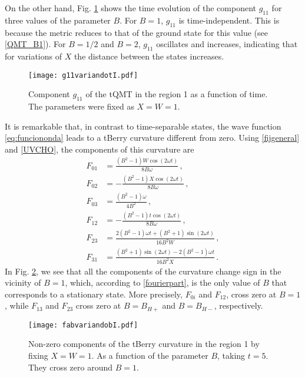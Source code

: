 \documentclass[12pt]{iopart}
\begin{document}
On the other hand, Fig. \ref{g11osc} shows the time evolution of the component $g_{11}$ for three values of the parameter $B$. For $B=1$, $g_{11}$ is time-independent. This is because the metric reduces to that of the ground state for this value (see \eqref{QMT_B1}). For $B=1/2$ and $B=2$, $g_{11}$ oscillates and increases, indicating that for variations of $X$ the distance between the states increases.  

\begin{figure}[ht!]
    \centering
    \texttt{[image: g11variandotI.pdf]}
  \captionsetup{font=small} 
    \caption{\justifying Component $g_{11}$ of the tQMT in the region 1 as a function of time. The parameters were fixed as $X=W=1$.}
    \label{g11osc}
\end{figure}

It is remarkable that, in contrast to time-separable states, the wave function \eqref{eq:funciononda} leads to a tBerry curvature different from zero. Using \eqref{fijgeneral} and \eqref{UVCHO}, the components of this curvature are
\begin{subequations}
    \begin{align}
    F_{01}&=\frac{\left(B^2-1\right) W \cos \left(2  \omega t\right)}{8 B \omega}\, ,\\
    F_{02} &= -\frac{\left(B^2-1\right) X \cos \left(2  \omega t \right)}{8 B \omega }\,,\\
    F_{03}&= \frac{\left(B^2-1\right) \omega}{4 B^2} \,,\\
     F_{12} &=-\frac{\left(B^2-1\right) t \cos \left(2  \omega t \right)}{8 B \omega }\,,\\ 
    F_{23} &=\frac{2 \left(B^2-1\right)  \omega t +\left(B^2+1\right) \sin \left(2  \omega t \right)}{16 B^2 W}\,,\\
    F_{31} &=\frac{\left(B^2+1\right) \sin \left(2  \omega t \right)-2 \left(B^2-1\right)  \omega t}{16 B^2 X}\,.
    \end{align}
\end{subequations}
In Fig. \ref{berry01}, we see that all the components of the curvature change sign in the vicinity of $B=1$, which, according to \eqref{fourierpart}, is the only value of $B$ that corresponds to a stationary state. More precisely, $F_{0i}$ and $F_{12}$, cross zero at $B=1$, while $F_{13}$ and $F_{23}$ cross zero at $B=B_{H+}$ and $B=B_{H-}$, respectively. 

\begin{figure}[H]
    \centering
    \texttt{[image: fabvariandobI.pdf]}
    \captionsetup{font=small} 
    \caption{ Non-zero components of the tBerry curvature in the region 1 by fixing $X=W=1$. As a function of the parameter $B$, taking $t=5$. They cross zero around $B=1$. }
    \label{berry01}
\end{figure}
\end{document}
